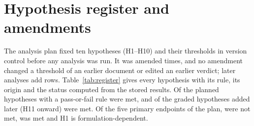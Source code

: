 \section{Hypothesis register and amendments}
\label{app:register}

The analysis plan fixed ten hypotheses (H1--H10) and their thresholds in version control before any analysis was run. It
was amended \resAmendmentCount{} times, and no amendment changed a threshold of an earlier document or edited an earlier
verdict; later analyses add rows. Table~\ref{tab:register} gives every hypothesis with its rule, its origin and the status
computed from the stored results. Of the \resPlannedGraded{} planned hypotheses with a pass-or-fail rule \resPlannedMet{}
were met, and of the \resLaterGraded{} graded hypotheses added later (H11 onward) \resLaterMet{} were met. Of the five primary endpoints of the plan, \resPrimaryNotMet{} were not met, \resPrimaryMet{} was met and H1 is
formulation-dependent.



